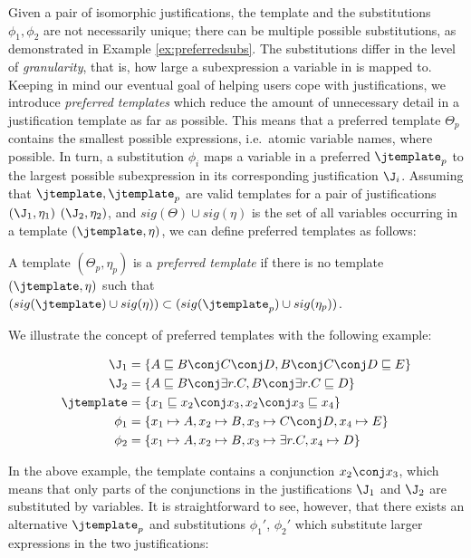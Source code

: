 Given a pair of isomorphic justifications, the template \jtemplate and the substitutions $\phi_{1}, \phi_{2}$ are not necessarily unique; there can be multiple possible substitutions, as demonstrated in Example \ref{ex:preferredsubs}. The substitutions differ in the level of \emph{granularity}, that is, how large a subexpression a variable in \jtemplate is mapped to. Keeping in mind our eventual goal of helping users cope with justifications, we introduce \emph{preferred templates} which reduce the amount of unnecessary detail in a justification template as far as possible. This means that a preferred template $\Theta_{p}$ contains the smallest possible expressions, i.e.\ atomic variable names, where possible. In turn, a substitution $\phi_{i}$ maps a variable in a preferred $\jtemplate_{p}$ to the largest possible subexpression in its corresponding justification $\J_{i}$. Assuming that $\jtemplate, \jtemplate_{p}$ are valid templates for a pair of justifications $(\J_{1}, \eta_{1})$ $(\J_{2}, \eta_{2})$, and $sig(\Theta) \cup sig(\eta)$ is the set of all variables occurring in a template $(\jtemplate, \eta)$, we can define preferred templates as follows:
\begin{defn}
A template $(\Theta_{p}, \eta_{p})$ is a \emph{preferred template} if there is no template $(\jtemplate, \eta)$ such that $(sig(\jtemplate) \cup sig(\eta)) \subset (sig(\jtemplate_{p}) \cup sig(\eta_{p}))$.
\end{defn}

We illustrate the concept of preferred templates with the following example:
\begin{examp}
\begin{align*}
\J_{1}  &= \{A \sqsubseteq B \conj C\conj D, B\conj C\conj D \sqsubseteq E \}  \\ 
\J_{2}  &=  \{ A \sqsubseteq B \conj \exists r.C, B \conj \exists r.C   \sqsubseteq D\}\\
\jtemplate  &=  \{x_{1} \sqsubseteq x_{2} \conj x_{3}, x_{2} \conj x_{3}\sqsubseteq x_{4} \}  \\ 
\phi_{1}  &=  \{ x_{1} \mapsto A, x_{2} \mapsto B, x_{3} \mapsto C \conj D, x_{4} \mapsto E\}\\
\phi_{2}  &= \{ x_{1} \mapsto A, x_{2} \mapsto B, x_{3} \mapsto \exists r.C, x_{4} \mapsto D\}
\end{align*}\label{ex:preferredsubs}
\end{examp}
In the above example, the template \jtemplate contains a conjunction $x_{2} \conj x_{3}$, which means that only parts of the conjunctions in the justifications $\J_{1}$ and $\J_{2}$ are substituted by variables. It is straightforward to see, however, that there exists an alternative $\jtemplate_{p}$ and substitutions $\phi_{1}'$, $\phi_{2}'$ which substitute larger expressions in the two justifications:

